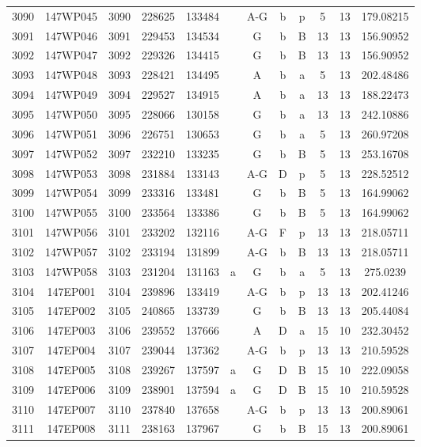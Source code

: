 \begin{tabular}{|*{12}{c|}}
3090 & 147WP045 & 3090 & 228625 & 133484 &  & A-G & b & p & 5 & 13 & 179.08215 \\ 
3091 & 147WP046 & 3091 & 229453 & 134534 &  & G & b & B & 13 & 13 & 156.90952 \\ 
3092 & 147WP047 & 3092 & 229326 & 134415 &  & G & b & B & 13 & 13 & 156.90952 \\ 
3093 & 147WP048 & 3093 & 228421 & 134495 &  & A & b & a & 5 & 13 & 202.48486 \\ 
3094 & 147WP049 & 3094 & 229527 & 134915 &  & A & b & a & 13 & 13 & 188.22473 \\ 
3095 & 147WP050 & 3095 & 228066 & 130158 &  & G & b & a & 13 & 13 & 242.10886 \\ 
3096 & 147WP051 & 3096 & 226751 & 130653 &  & G & b & a & 5 & 13 & 260.97208 \\ 
3097 & 147WP052 & 3097 & 232210 & 133235 &  & G & b & B & 5 & 13 & 253.16708 \\ 
3098 & 147WP053 & 3098 & 231884 & 133143 &  & A-G & D & p & 5 & 13 & 228.52512 \\ 
3099 & 147WP054 & 3099 & 233316 & 133481 &  & G & b & B & 5 & 13 & 164.99062 \\ 
3100 & 147WP055 & 3100 & 233564 & 133386 &  & G & b & B & 5 & 13 & 164.99062 \\ 
3101 & 147WP056 & 3101 & 233202 & 132116 &  & A-G & F & p & 13 & 13 & 218.05711 \\ 
3102 & 147WP057 & 3102 & 233194 & 131899 &  & A-G & b & B & 13 & 13 & 218.05711 \\ 
3103 & 147WP058 & 3103 & 231204 & 131163 & a & G & b & a & 5 & 13 & 275.0239 \\ 
3104 & 147EP001 & 3104 & 239896 & 133419 &  & A-G & b & p & 13 & 13 & 202.41246 \\ 
3105 & 147EP002 & 3105 & 240865 & 133739 &  & G & b & B & 13 & 13 & 205.44084 \\ 
3106 & 147EP003 & 3106 & 239552 & 137666 &  & A & D & a & 15 & 10 & 232.30452 \\ 
3107 & 147EP004 & 3107 & 239044 & 137362 &  & A-G & b & p & 13 & 13 & 210.59528 \\ 
3108 & 147EP005 & 3108 & 239267 & 137597 & a & G & D & B & 15 & 10 & 222.09058 \\ 
3109 & 147EP006 & 3109 & 238901 & 137594 & a & G & D & B & 15 & 10 & 210.59528 \\ 
3110 & 147EP007 & 3110 & 237840 & 137658 &  & A-G & b & p & 13 & 13 & 200.89061 \\ 
3111 & 147EP008 & 3111 & 238163 & 137967 &  & G & b & B & 15 & 13 & 200.89061 \\ 

\end{tabular}
